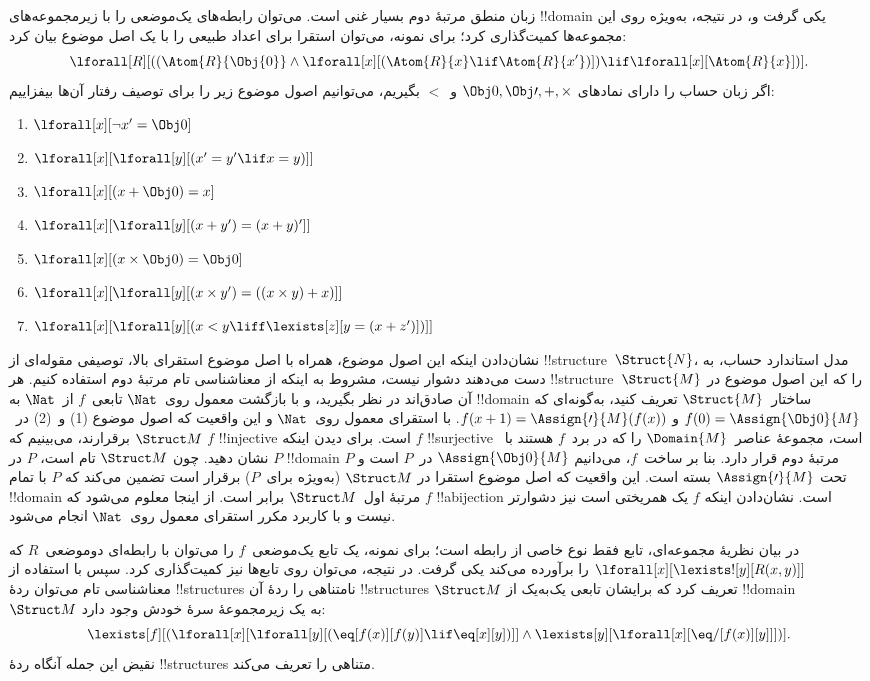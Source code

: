 \documentclass[../../../include/open-logic-section]{subfiles}
\begin{document}
زبان منطق مرتبهٔ دوم بسیار غنی است. می‌توان رابطه‌های یک‌موضعی را با
زیرمجموعه‌های !!{domain} یکی گرفت و، در نتیجه، به‌ویژه روی این مجموعه‌ها
کمیت‌گذاری کرد؛ برای نمونه، می‌توان استقرا برای اعداد طبیعی را با یک
اصل موضوع بیان کرد:
\[
\lforall[R][((\Atom{R}{\Obj{0}} \land \lforall[x][(\Atom{R}{x} \lif
    \Atom{R}{x'})]) \lif \lforall[x][\Atom{R}{x}])].
\]
اگر زبان حساب را دارای نمادهای $\Obj 0, \Obj \prime, +,
\times$ و~$<$ بگیریم، می‌توانیم اصول موضوع زیر را برای توصیف رفتار
آن‌ها بیفزاییم:
\begin{enumerate}
\item $\lforall[x][\lnot x' = \Obj 0]$
\item $\lforall[x][\lforall[y][(x' = y' \lif x = y)]]$
\item $\lforall[x][(x + \Obj 0) = x]$
\item $\lforall[x][\lforall[y][(x + y') = (x + y)']]$
\item $\lforall[x][(x \times \Obj 0) = \Obj 0]$
\item $\lforall[x][\lforall[y][(x \times y') = ((x \times y) + x)]]$
\item $\lforall[x][\lforall[y][(x < y \liff \lexists[z][y = (x + z')])]]$
\end{enumerate}
نشان‌دادن اینکه این اصول موضوع، همراه با اصل موضوع استقرای بالا، توصیفی
مقوله‌ای از !!{structure}~$\Struct{N}$، مدل استاندارد حساب، به دست
می‌دهند دشوار نیست، مشروط به اینکه از معناشناسی تام مرتبهٔ دوم استفاده
کنیم. هر !!{structure}~$\Struct{M}$ را که این اصول موضوع در آن صادق‌اند
در نظر بگیرید، و با بازگشت معمول روی~$\Nat$ تابعی~$f$ از~$\Nat$ به
!!{domain} ساختار~$\Struct{M}$ تعریف کنید، به‌گونه‌ای که
$f(0) = \Assign{\Obj 0}{M}$ و
$f(x+1) = \Assign{\prime}{M}(f(x))$. با استقرای معمول روی~$\Nat$ و
این واقعیت که اصول موضوع (1) و~(2) در~$\Struct M$ برقرارند، می‌بینیم
که $f$ !!{injective} است. برای دیدن اینکه $f$ !!{surjective} است،
مجموعهٔ عناصر~$\Domain{M}$ را که در برد~$f$ هستند با~$P$ نشان دهید.
چون $\Struct M$ تام است، $P$ در !!{domain} مرتبهٔ دوم قرار دارد. بنا بر
ساخت~$f$، می‌دانیم $\Assign{\Obj 0}{M}$ در~$P$ است و $P$ تحت
$\Assign{\prime}{M}$ بسته است. این واقعیت که اصل موضوع استقرا در
$\Struct M$ (به‌ویژه برای~$P$) برقرار است تضمین می‌کند که $P$ با تمام
!!{domain} مرتبهٔ اول~$\Struct M$ برابر است. از اینجا معلوم می‌شود که
$f$ !!a{bijection} است. نشان‌دادن اینکه $f$ یک همریختی است نیز دشوارتر
نیست و با کاربرد مکرر استقرای معمول روی~$\Nat$ انجام می‌شود.

در بیان نظریهٔ مجموعه‌ای، تابع فقط نوع خاصی از رابطه است؛ برای نمونه،
یک تابع یک‌موضعی~$f$ را می‌توان با رابطه‌ای دوموضعی~$R$ که
$\lforall[x][\lexists![y][R(x,y)]]$ را برآورده می‌کند یکی گرفت. در
نتیجه، می‌توان روی تابع‌ها نیز کمیت‌گذاری کرد. سپس با استفاده از
معناشناسی تام می‌توان ردهٔ !!{structure}s نامتناهی را ردهٔ آن
!!{structure}s $\Struct M$ تعریف کرد که برایشان تابعی یک‌به‌یک از
!!{domain}~$\Struct M$ به یک زیرمجموعهٔ سرهٔ خودش وجود دارد:
\[
\lexists[f][(\lforall[x][\lforall[y][(\eq[f(x)][f(y)] \lif \eq[x][y])]]
  \land \lexists[y][\lforall[x][\eq/[f(x)][y]]])].
\]
نقیض این جمله آنگاه ردهٔ !!{structure}s متناهی را تعریف می‌کند.
\end{document}
